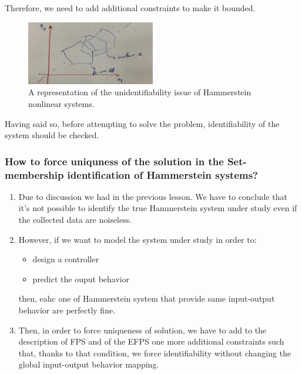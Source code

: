 Therefore, we need to add additional constraints to make it bounded.

\begin{figure}[htbp]
    \centering
    \includegraphics[width=0.5\textwidth]{images/unidentifiability_hammer.jpg}
    \caption{A representation of the unidentifiability issue of Hammerstein nonlinear systems.}
    \label{fig:signal-and-noise}
\end{figure}

Having said so, before attempting to solve the problem, identifiability of the system should be checked.

\subsubsection{How to force uniquness of the solution in the Set-membership identification of Hammerstein systems?}
\begin{enumerate}
    \item Due to discussion we had in the previous lesson. We have to conclude that it's not possible to identify the true Hammerstein system under study even if the collected data are noiseless.
    \item However, if we want to model the system under study in order to: 
    \begin{itemize}
        \item design a controller
        \item predict the ouput behavior 
    \end{itemize}
    then, eahc one of Hammerstein system that provide same input-output behavior are perfectly fine.
    \item Then, in order to force uniqueness of solution, we  have to add to the description of FPS and of the EFPS one more additional constraints such that, thanks to that condition, we force identifiability without changing the global input-output behavior mapping.
\end{enumerate}

